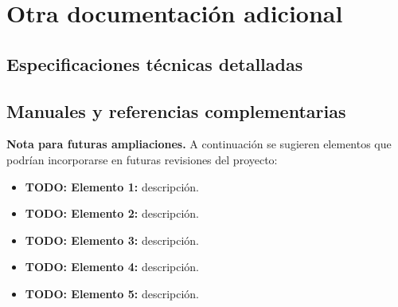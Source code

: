 \chapter{Otra documentación adicional}


\section{Especificaciones técnicas detalladas}


\section{Manuales y referencias complementarias}


\vspace{1em}

\noindent\textbf{Nota para futuras ampliaciones.} A continuación se sugieren elementos que podrían incorporarse en futuras revisiones del proyecto:

\begin{itemize}
    \item \textbf{TODO: Elemento 1:} descripción.
    \item \textbf{TODO: Elemento 2:} descripción.
    \item \textbf{TODO: Elemento 3:} descripción.
    \item \textbf{TODO: Elemento 4:} descripción.
    \item \textbf{TODO: Elemento 5:} descripción.
\end{itemize}
